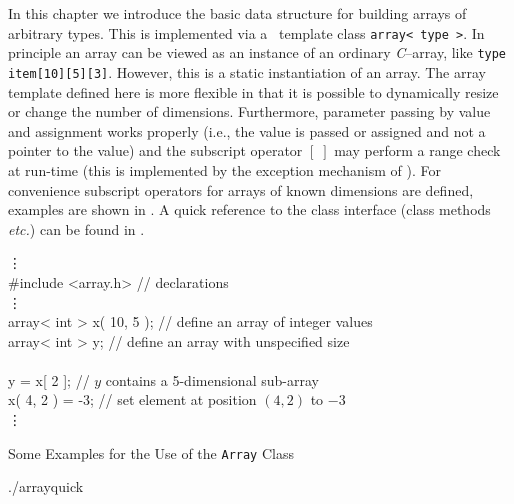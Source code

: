 \def\Arrayrootdir{.}


In this chapter we introduce the basic data structure for
building arrays of arbitrary types.  This is implemented via a
\cpp\ template class \verb+array< type >+. In principle an array
can be viewed as an instance of an ordinary \emph{C}--array, like
\verb+type item[10][5][3]+.  However, this is a static instantiation
of an array. The array template defined here is more flexible in that
it is possible to dynamically resize or change the number of
dimensions.  Furthermore, parameter passing by value and assignment
works properly (i.e., the value is passed or assigned and not a
pointer to the value) and the subscript operator $[\;]$ may perform a
range check at run-time (this is implemented by the exception
mechanism of \cpp). For convenience subscript operators for arrays of
known dimensions are defined, examples are shown in
. A quick reference to the class
interface (class methods \emph{etc.}) can be found in
. 

\begin{example}[hb]
\begin{shortlisting}
            \vdots\\
\#include <array.h>         // {\rm declarations}\\
            \vdots\\
array< int > x( 10, 5 );   // {\rm define an array of integer values\hspace*{-10cm}}\\
array< int > y;            // {\rm define an array with unspecified size\hspace*{-10cm}}\\
\\
y = x[ 2 ];                // {\rm $y$ contains a 5-dimensional sub-array}\\
x( 4, 2 ) = -3;            // {\rm set element at position $( 4, 2 )$ to $-3$}\\
            \vdots\\
\end{shortlisting}
\caption[Some Examples for the Use of the \texttt{Array} Class]{Some
Examples for the Use of the \texttt{Array}
Class\label{array:example:array}}
\end{example}


 \Arrayrootdir/arrayquick

